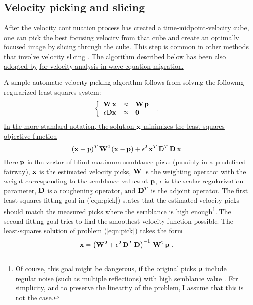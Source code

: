 
\subsection{Velocity picking and slicing}

After the velocity continuation process has created a time-midpoint-velocity
cube, one can pick the best focusing velocity from that cube and create an
optimally focused image by slicing through the cube. \uline{This step is common in
other methods that involve velocity slicing}
\cite{shurtleff,SEG-1984-S1.8,GEO57-01-00510059}. \uline{The algorithm described
below has been also adopted by}  \uline{for velocity
analysis in wave-equation migration.}

A simple automatic velocity picking algorithm follows from solving the
following regularized least-squares system:
\begin{equation}
  \label{eqn:pick}
  \left\{\begin{array}{rcl}
      \bold{W}\,\bold{x} & \approx & \bold{W}\,\bold{p} \\
      \epsilon \bold{D} \bold{x} & \approx & \bold{0}
    \end{array}\right.\;.
\end{equation}
\uline{In the more standard notation, the solution $\bold{x}$ minimizes the
least-squares objective function}
\begin{equation}
  \label{eqn:ofpick}
(\bold{x}-\bold{p})^{T}\, \bold{W}^2\,(\bold{x}-\bold{p}) +
\epsilon^2\,\bold{x}^T\,\bold{D}^T\,\bold{D}\,\bold{x}
\end{equation}
Here $\bold{p}$ is the vector of blind maximum-semblance picks (possibly in a
predefined fairway), $\bold{x}$ is the estimated velocity picks, $\bold{W}$ is
the weighting operator with the weight corresponding to the semblance values
at $\bold{p}$, $\epsilon$ is the scalar regularization parameter, $\bold{D}$
is a roughening operator, and $\bold{D}^T$ is the adjoint operator.  The first
least-squares fitting goal in (\ref{eqn:pick}) states that the estimated
velocity picks should match the measured picks where the semblance is high
enough\footnote{Of course, this goal might be dangerous, if the original picks
  $\bold{p}$ include regular noise (such as multiple reflections) with high
  semblance value \cite{Toldi.sepphd.43}. For simplicity, and to preserve the
  linearity of the problem, I assume that this is not the case.}.  The second
fitting goal tries to find the smoothest velocity function possible.  The
least-squares solution of problem (\ref{eqn:pick}) takes the form
\begin{equation}
  \label{eqn:LS}
  \bold{x} = 
  \left(\bold{W}^2 + 
    \epsilon^2\,\bold{D}^T\,\bold{D}\right)^{-1}\,\bold{W}^2\,\bold{p}\;.
\end{equation}

